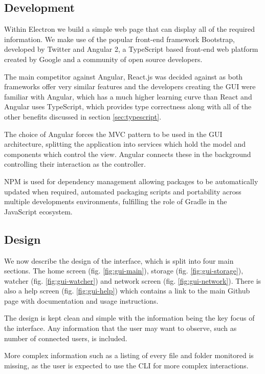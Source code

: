 \documentclass[11pt, a4paper, twocolumn, twoside]{report}
\begin{document}
\subsection{Development}

Within Electron we build a simple web page that can display all of the required information. We make use of the popular front-end framework Bootstrap, developed by Twitter and Angular 2, a TypeScript based front-end web platform created by Google and a community of open source developers.

The main competitor against Angular, React.js was decided against as both frameworks offer very similar features and the developers creating the GUI were familiar with Angular, which has a much higher learning curve than React \citep{house2016ng2react} and Angular uses TypeScript, which provides type correctness along with all of the other benefits discussed in section \ref{sec:typescript}.

The choice of Angular forces the MVC pattern to be used in the GUI architecture, splitting the application into services which hold the model and components which control the view. Angular connects these in the background controlling their interaction as the controller.

NPM is used for dependency management allowing packages to be automatically updated when required, automated packaging scripts and portability across multiple developments environments, fulfilling the role of Gradle in the JavaScript ecosystem.

\subsection{Design}

We now describe the design of the interface, which is split into four main sections. The home screen (fig. \ref{fig:gui-main}), storage (fig. \ref{fig:gui-storage}), watcher (fig. \ref{fig:gui-watcher}) and network screen (fig. \ref{fig:gui-network}). There is also a help screen (fig. \ref{fig:gui-help}) which contains a link to the main Github page with documentation and usage instructions.

The design is kept clean and simple with the information being the key focus of the interface. Any information that the user may want to observe, such as number of connected users, is included.

More complex information such as a listing of every file and folder monitored is missing, as the user is expected to use the CLI for more complex interactions.
\end{document}
